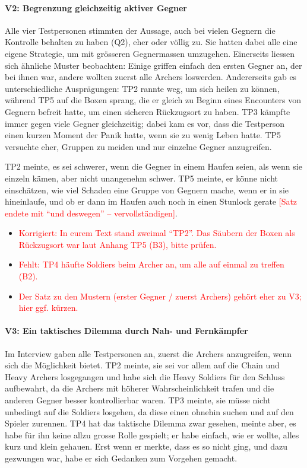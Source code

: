 \documentclass[../Main.tex]{subfiles}
\begin{document}
\paragraph{V2: Begrenzung gleichzeitig aktiver Gegner}
Alle vier Testpersonen stimmten der Aussage, auch bei vielen Gegnern die Kontrolle behalten zu haben (Q2), eher oder völlig zu. Sie hatten dabei alle eine eigene Strategie, um mit grösseren Gegnermassen umzugehen. Einerseits liessen sich ähnliche Muster beobachten: Einige griffen einfach den ersten Gegner an, der bei ihnen war, andere wollten zuerst alle Archers loswerden. Andererseits gab es unterschiedliche Ausprägungen: TP2 rannte weg, um sich heilen zu können, während TP5 auf die Boxen sprang, die er gleich zu Beginn eines Encounters von Gegnern befreit hatte, um einen sicheren Rückzugsort zu haben. TP3 kämpfte immer gegen viele Gegner gleichzeitig; dabei kam es vor, dass die Testperson einen kurzen Moment der Panik hatte, wenn sie zu wenig Leben hatte. TP5 versuchte eher, Gruppen zu meiden und nur einzelne Gegner anzugreifen.

TP2 meinte, es sei schwerer, wenn die Gegner in einem Haufen seien, als wenn sie einzeln kämen, aber nicht unangenehm schwer. TP5 meinte, er könne nicht einschätzen, wie viel Schaden eine Gruppe von Gegnern mache, wenn er in sie hineinlaufe, und ob er dann im Haufen auch noch in einen Stunlock gerate \textcolor{red}{[Satz endete mit \enquote{und deswegen} -- vervollständigen]}.

\begin{itemize}[leftmargin=1.5cm]
    \item \textcolor{red}{Korrigiert: In eurem Text stand zweimal \enquote{TP2}. Das Säubern der Boxen als Rückzugsort war laut Anhang TP5 (B3), bitte prüfen.}
    \item \textcolor{red}{Fehlt: TP4 häufte Soldiers beim Archer an, um alle auf einmal zu treffen (B2).}
    \item \textcolor{red}{Der Satz zu den Mustern (erster Gegner / zuerst Archers) gehört eher zu V3; hier ggf. kürzen.}
\end{itemize}

\paragraph{V3: Ein taktisches Dilemma durch Nah- und Fernkämpfer}
Im Interview gaben alle Testpersonen an, zuerst die Archers anzugreifen, wenn sich die Möglichkeit bietet. TP2 meinte, sie sei vor allem auf die Chain und Heavy Archers losgegangen und habe sich die Heavy Soldiers für den Schluss aufbewahrt, da die Archers mit höherer Wahrscheinlichkeit trafen und die anderen Gegner besser kontrollierbar waren. TP3 meinte, sie müsse nicht unbedingt auf die Soldiers losgehen, da diese einen ohnehin suchen und auf den Spieler zurennen. TP4 hat das taktische Dilemma zwar gesehen, meinte aber, es habe für ihn keine allzu grosse Rolle gespielt; er habe einfach, wie er wollte, alles kurz und klein gehauen. Erst wenn er merkte, dass es so nicht ging, und dazu gezwungen war, habe er sich Gedanken zum Vorgehen gemacht.
\end{document}
